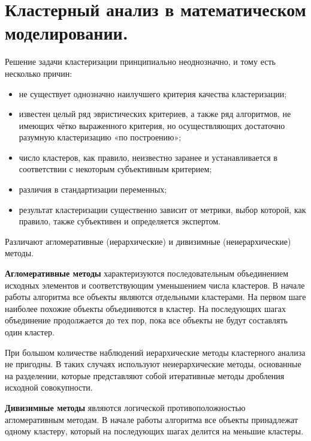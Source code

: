 \section{Кластерный анализ в математическом моделировании.}

Решение задачи кластеризации принципиально неоднозначно, и тому есть несколько причин:
\begin{itemize}
  \item не существует однозначно наилучшего критерия качества кластеризации;
  \item известен целый ряд эвристических критериев, а также ряд алгоритмов, не имеющих чётко выраженного критерия, но осуществляющих достаточно разумную кластеризацию «по построению»;
  \item число кластеров, как правило, неизвестно заранее и устанавливается в соответствии с некоторым субъективным критерием;
  \item различия в стандартизации переменных;
  \item результат кластеризации существенно зависит от метрики, выбор которой, как правило, также субъективен и определяется экспертом.
\end{itemize}

Различают агломеративные (иерархические) и дивизимные (неиерархические) методы.

\textbf{Агломеративные методы} характеризуются последовательным объединением исходных элементов и соответствующим уменьшением числа кластеров. В начале работы алгоритма все объекты являются отдельными кластерами. На первом шаге наиболее похожие объекты объединяются в кластер. На последующих шагах объединение продолжается до тех пор, пока все объекты не будут составлять один кластер.

При большом количестве наблюдений иерархические методы кластерного анализа не пригодны. В таких случаях используют неиерархические методы, основанные на разделении, которые представляют собой итеративные методы дробления исходной совокупности.

\textbf{Дивизимные методы} являются логической противоположностью агломеративным методам. В начале работы алгоритма все объекты принадлежат одному кластеру, который на последующих шагах делится на меньшие кластеры.


